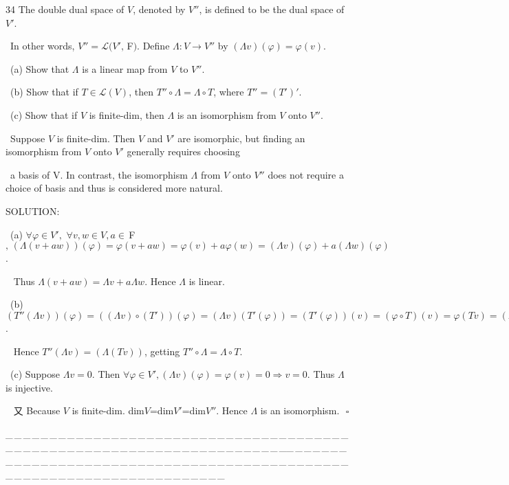 \documentclass[a4paper, 11pt, UTF8]{article}
\def\Lm{\mathcal{L}}
\def\Fbfc{$\,{\timesbf F}$}
\begin{document}
\begin{large}
{\timesbf\Large 34} {\timessl\Large The double dual space of $V$, denoted by $V''$, is defined to be the dual space
of $V'$.}\par\quad\,
{\timessl\Large In other words, $V''=\Lm(V',\Fbfc)$. Define $\Lambda:V\rightarrow V''$ by $(\Lambda v)(\varphi) = \varphi(v)$.}\par\quad\,
(a) {\timessl\Large Show that $\Lambda$ is a linear map from $V$ to $V''$.}\par\quad\,
(b) {\timessl\Large Show that if $T\in\Lm(V)$, then $T''\circ\Lambda=\Lambda\circ T$, where $T''=(T')'$.}\par\quad\,
(c) {\timessl\Large Show that if $V$ is finite-dim, then $\Lambda$ is an isomorphism from $V$ onto $V''$.}\par\quad\,
{\timessl\small Suppose $V$ is finite-dim. Then $V$ and $V'$ are isomorphic, but finding an isomorphism from $V$ onto $V'$ generally requires choosing}\par\quad\,
{\timessl\small a basis of V. In contrast, the isomorphism $\Lambda$ from $V$ onto $V''$ does not require a choice of basis and thus is considered more natural.}\par
{\timesbf S\footnotesize{OLUTION:}}\par\quad\,
(a) $\forall\varphi\in V',\,\,\forall v,w\in V,a\in\Fbfc,\,(\Lambda(v+a w))(\varphi)=\varphi(v+aw)=\varphi(v)+a\varphi(w)=(\Lambda v)(\varphi)+a(\Lambda w)(\varphi)$.\par\qquad\,\,\,
Thus $\Lambda(v+aw)=\Lambda v+a\Lambda w$. Hence $\Lambda$ is linear.\par\quad\,
(b) $(T''(\Lambda v))(\varphi)=((\Lambda v)\circ(T'))(\varphi)=(\Lambda v)(T'(\varphi))=(T'(\varphi))(v)=(\varphi\circ T)(v)=\varphi(Tv)=(\Lambda(Tv))(\varphi)$.\par\qquad\,\,\,
Hence $T''(\Lambda v)=(\Lambda(Tv))$, getting $T''\circ\Lambda=\Lambda\circ T$.\par\quad\,
(c) Suppose $\Lambda v=0$. Then $\forall\varphi\in V',(\Lambda v)(\varphi)=\varphi(v)=0\Rightarrow v=0$. Thus $\Lambda$ is injective.\par\qquad\,\,\,
又 Because $V$ is finite-dim. dim$V$=dim$V'$=dim$V''$. Hence $\Lambda$ is an isomorphism.$\,\,\,\,\square$\par
{\tiny \_\,\_\,\_\,\_\,\_\,\_\,\_\,\_\,\_\,\_\,\_\,\_\,\_\,\_\,\_\,\_\,\_\,\_\,\_\,\_\,\_\,\_\,\_\,\_\,\_\,\_\,\_\,\_\,\_\,\_\,\_\,\_\,\_\,\_\,\_\,\_\,\_\,\_\,\_\,\_\,\_\,\_\,\_\,\_\,\_\,\_\,\_\,\_\,\_\,\_\,\_\,\_\,\_\,\_\,\_\,\_\,\_\,\_\,\_\,\_\,\_\,\_\,\_\,\_\,\_\,\_\,\_\,\_\,\_\,\_\,\_\_\,\_\,\_\,\_\,\_\,\_\,\_\,\_\,\_\,\_\,\_\,\_\,\_\,\_\,\_\,\_\,\_\,\_\,\_\,\_\,\_\,\_\,\_\,\_\,\_\,\_\,\_\,\_\,\_\,\_\,\_\,\_\,\_\,\_\,\_\,\_\,\_\,\_\,\_\,\_\,\_\,\_\,\_\,\_\,\_\,\_\,\_\,\_\,\_\,\_\,\_\,\_\,\_\,\_\,\_\,\_\,\_\,\_\,\_\,\_\,\_\,\_\,\_\,\_\,\_\,\_\,\_\,\_\,\_\,\_\,\_}\par


\end{large}
\end{document}

